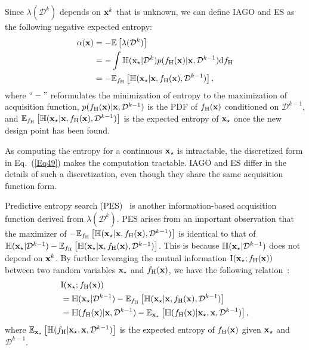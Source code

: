 \documentclass[iicol,sn-basic]{sn-jnl}%
\theoremstyle{thmstyleone}%
\theoremstyle{thmstyletwo}
\theoremstyle{thmstylethree}
\begin{document}
\begin{linenumbers}
Since $\lambda(\mathcal{D}^{k})$ depends on ${\bf x}^k$ that is unknown, we can define IAGO and ES as the following negative expected entropy:
\begin{equation}\label{Eq49}
	\begin{aligned}
		\alpha({\bf x}) & = -\mathbb{E}\left[\lambda(\mathcal{D}^{k})\right]\\
		& = -\int \mathbb{H}({\bf x}_\star|\mathcal{D}^{k})  p(f_\text{H}({\bf x})|{\bf x},\mathcal{D}^{k-1}) \text{d}f_\text{H}\\
		& = -\mathbb{E}_{f_\text{H}}\left[\mathbb{H}({\bf x}_\star|{\bf x},f_\text{H}({\bf x}),\mathcal{D}^{k-1})\right],
	\end{aligned}
\end{equation}
where $``-"$ reformulates the minimization of entropy to the maximization of acquisition function, $p(f_\text{H}({\bf x})|{\bf x},\mathcal{D}^{k-1})$ is the PDF of $f_\text{H}(\bf x)$ conditioned on $\mathcal{D}^{k-1}$, and $\mathbb{E}_{f_\text{H}}\left[\mathbb{H}({\bf x}_\star|{\bf x},f_\text{H}({\bf x}),\mathcal{D}^{k-1})\right]$ is the expected entropy of ${\bf x}_\star$ once the new design point has been found.

As computing the entropy for a continuous ${\bf x}_\star$ is intractable, the discretized form in Eq.~(\ref{Eq49}) makes the computation tractable.
IAGO and ES differ in the details of such a discretization, even though they share the same acquisition function form.

Predictive entropy search (PES)~\citep{Lobato2014} is another information-based acquisition function derived from $\lambda(\mathcal{D}^{k})$.
PES arises from an important observation that the maximizer of $-\mathbb{E}_{f_\text{H}}\left[\mathbb{H}({\bf x}_\star|{\bf x},f_\text{H}({\bf x}),\mathcal{D}^{k-1})\right]$ is identical to that of $\mathbb{H}({\bf x}_\star|\mathcal{D}^{k-1})-\mathbb{E}_{f_\text{H}}\left[\mathbb{H}({\bf x}_\star|{\bf x},f_\text{H}({\bf x}),\mathcal{D}^{k-1})\right]$.
This is because $\mathbb{H}({\bf x}_\star|\mathcal{D}^{k-1})$ does not depend on ${\bf x}^k$.
By further leveraging the mutual information $\text{I}({\bf x}_\star;f_\text{H}({\bf x}))$ between two random variables ${\bf x}_\star$ and $f_\text{H}({\bf x})$, we have the following relation~\citep{Houlsby2012}:
\begin{equation}\label{Eq50}
	\begin{aligned}
		& \text{I}({\bf x}_\star;f_\text{H}({\bf x})) \\ 
		& = \mathbb{H}({\bf x}_\star|\mathcal{D}^{k-1})-\mathbb{E}_{f_\text{H}}\left[\mathbb{H}({\bf x}_\star|{\bf x},f_\text{H}({\bf x}),\mathcal{D}^{k-1})\right]\\
		& = \mathbb{H}(f_\text{H}({\bf x})|{\bf x},\mathcal{D}^{k-1})-\mathbb{E}_{{\bf x}_\star}\left[\mathbb{H}(f_\text{H}({\bf x})|{\bf x}_\star,{\bf x},\mathcal{D}^{k-1})\right],
	\end{aligned}
\end{equation}
where $\mathbb{E}_{{\bf x}_\star}\left[\mathbb{H}(f_\text{H}|{\bf x}_\star,{\bf x},\mathcal{D}^{k-1})\right]$ is the expected entropy of $f_\text{H}({\bf x})$ given ${\bf x}_\star$ and $\mathcal{D}^{k-1}$.


\end{linenumbers}
\end{document}
